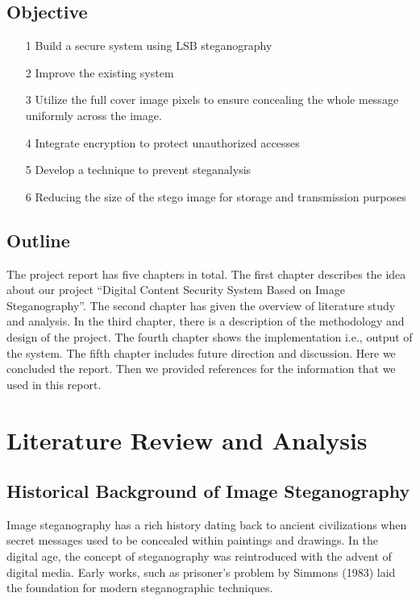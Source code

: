 \documentclass{report}
\begin{document}
\section{Objective}
\begin{itemize}
    \item[1] Build a secure system using LSB steganography
    \item[2] Improve the existing system
    \item[3] Utilize the full cover image pixels to ensure concealing the whole message uniformly across the image.
    \item[4] Integrate encryption to protect unauthorized accesses 
    \item[5] Develop a technique to prevent steganalysis
    \item[6] Reducing the size of the stego image for storage and transmission purposes
\end{itemize}
\section{Outline}
The project report has five chapters in total. The first chapter describes the idea about our project “Digital Content Security System Based on Image Steganography”. The second chapter has given the overview of literature study and analysis. In the third chapter, there is a description of the methodology and design of the project. The fourth chapter shows the implementation i.e., output of the system. The fifth chapter includes future direction and discussion. Here we concluded the report. Then we provided references for the information that we used in this report.

\chapter{Literature Review and Analysis}

\section{Historical Background of Image Steganography} 
Image steganography has a rich history dating back to ancient civilizations when secret messages used to be concealed within paintings and drawings. In the digital age, the concept of steganography was reintroduced with the advent of digital media. Early works, such as prisoner’s problem by Simmons (1983) laid the foundation for modern steganographic techniques.\cite{bohme2010principles}\\
\end{document}
